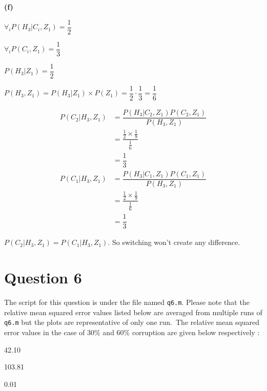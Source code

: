 \documentclass{article}
\theoremstyle{remark}
\begin{document}
\hspace{2.5em} \textbf{(f)}
\begin{center}
    $ \forall_i P(H_3|C_i,Z_1)=\dfrac{1}{2}$ \par
    $\forall_i P(C_i,Z_1)=\dfrac{1}{3}$ \par

    $P(H_3|Z_1)=\dfrac{1}{2}$ \par
    $P(H_3,Z_1)=P(H_3|Z_1) \times P(Z_1)=\dfrac{1}{2} \cdot \dfrac{1}{3}=\dfrac{1}{6} $ \par
    \begin{align*}
        P(C_2|H_3,Z_1) & = \dfrac{P(H_3|C_2,Z_1)P(C_2,Z_1)}{P(H_3,Z_1)}        \\
                       & = \dfrac{\frac{1}{2} \times \frac{1}{9}}{\frac{1}{6}} \\
                       & = \dfrac{1}{3}
    \end{align*}
    \begin{align*}
        P(C_1|H_3,Z_1) & = \dfrac{P(H_3|C_1,Z_1)P(C_1,Z_1)}{P(H_3,Z_1)}       \\
                       & =\dfrac{\frac{1}{2} \times \frac{1}{9}}{\frac{1}{6}} \\
                       & = \dfrac{1}{3}
    \end{align*}



    $P(C_2|H_3,Z_1) = P(C_1|H_3,Z_1)$. So switching won't create any difference.



\end{center}





\newpage



\section{Question 6}
The script for this question is under the file named \texttt{q6.m}.
Please note that the relative mean squared error values listed below are averaged from multiple runs of \texttt{q6.m} but the plots are representative of only one run.\
The relative mean squared error values in the case of 30\% and 60\% corruption are given below respectively :
\begin{description}[noitemsep]
    \item [Moving Median Filtering]\hspace{0.1em} 42.10
    \item [Moving Mean Filtering]\hspace{0.2em} 103.81
    \item [Moving Quartile Filtering]  0.01
\end{description}
\end{document}
